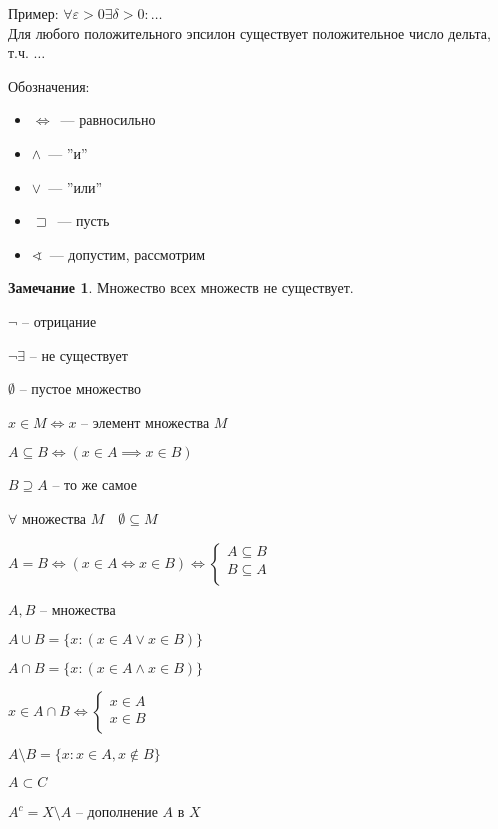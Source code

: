 \documentclass{book}
\renewcommand\O{\ensuremath{\emptyset}}
\theoremstyle{definition}
\newtheorem*{note}{Замечание}
\begin{document}
    Пример: $\forall \varepsilon>0 \exists  \delta>0 :\ldots$\\
    Для любого положительного эпсилон существует положительное число дельта, т.ч. $\ldots$
   
    Обозначения:
    \begin{itemize}
        \item $\iff $~--- равносильно
        \item $\wedge$~--- ''и''
        \item $\vee$~--- ''или''
        \item $\sqsupset$~--- пусть
        \item $\sphericalangle$~--- допустим, рассмотрим
    \end{itemize}

    \begin{note}
        Множество всех множеств не существует.

        $\neg$ -- отрицание
        
        $\neg \exists $ -- не существует
        
        $\O $ -- пустое множество

        $x\in M \iff x$ -- элемент множества $M$

        $A\subseteq B \iff  (x\in A \implies  x\in B)$

        $B\supseteq A$ -- то же самое
    \end{note}
    $\forall $ множества $M\quad \O \subseteq M$

    $A = B \iff  \left( x\in A \iff x\in B \right)  \iff 
    \begin{cases}
        A\subseteq B\\
        B\subseteq A\\
    \end{cases}$
    
    
    $A,B$ -- множества 

    $A\cup B = \{x: (x\in A \vee x\in B)\}$
        
    $A\cap B = \{x: (x\in A \wedge x\in B)\}$

    $x\in A\cap B \iff  \begin{cases}
        x\in A\\
        x\in B\\
    \end{cases}$

    $A\setminus B = \{x:x \in A, x\not\in B \}$

    $A\subset C$

    $A^c = X\setminus A$ -- дополнение $A$ в $X$
\end{document}
